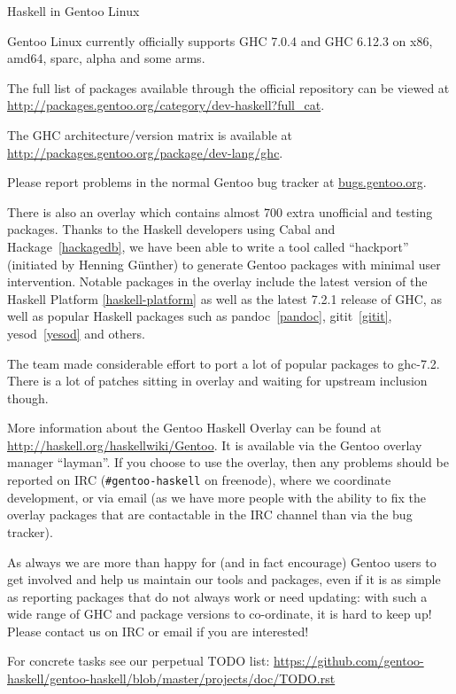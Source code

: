 \begin{hcarentry}[updated]{Haskell in Gentoo Linux}
\label{gentoo}
\makeheader

Gentoo Linux currently officially supports GHC 7.0.4 and GHC 6.12.3
on x86, amd64, sparc, alpha and some arms.

The full list of packages available through the official repository
can be viewed at
\url{http://packages.gentoo.org/category/dev-haskell?full\_cat}.

The GHC architecture/version matrix is available at
\url{http://packages.gentoo.org/package/dev-lang/ghc}.

Please report problems in the normal Gentoo bug tracker
at \url{bugs.gentoo.org}.

There is also an overlay which contains almost 700 extra unofficial
and testing packages. Thanks to the Haskell developers using Cabal and
Hackage~\cref{hackagedb}, we have been able to write a tool called
``hackport'' (initiated by Henning G\"unther) to generate Gentoo
packages with minimal user intervention. Notable packages in the
overlay include the latest version of the Haskell Platform \cref{haskell-platform} as well as
the latest 7.2.1 release of GHC, as well as popular Haskell packages
such as pandoc~\cref{pandoc}, gitit~\cref{gitit}, yesod~\cref{yesod} and others.

The team made considerable effort to port a lot of popular packages to ghc-7.2.
There is a lot of patches sitting in overlay and waiting for upstream inclusion though.

More information about the Gentoo Haskell Overlay can be found at
\url{http://haskell.org/haskellwiki/Gentoo}. It is available via the Gentoo
overlay manager ``layman''.  If you choose to use the overlay, then
any problems should be reported on IRC (\verb+#gentoo-haskell+ on
freenode), where we coordinate development, or via email
 (as we have more people with the ability to
fix the overlay packages that are contactable in the IRC channel than
via the bug tracker).

As always we are more than happy for (and in fact encourage) Gentoo
users to get involved and help us maintain our tools and packages,
even if it is as simple as reporting packages that do not always work
or need updating: with such a wide range of GHC and package versions
to co-ordinate, it is hard to keep up!  Please contact us on IRC or
email if you are interested!

For concrete tasks see our perpetual TODO list:
\url{https://github.com/gentoo-haskell/gentoo-haskell/blob/master/projects/doc/TODO.rst}
\end{hcarentry}
